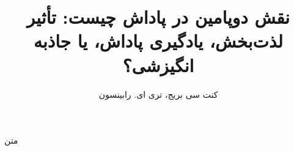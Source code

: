 \documentclass[a4paper,10pt]{article}
\title{نقش دوپامین در پاداش چیست: تأثیر لذت‌بخش، یادگیری پاداش، یا جاذبه انگیزشی؟}
\author{کنت سی بریج، تری ای. رابینسون}
\begin{document}
    \maketitle

    متن
\end{document}
